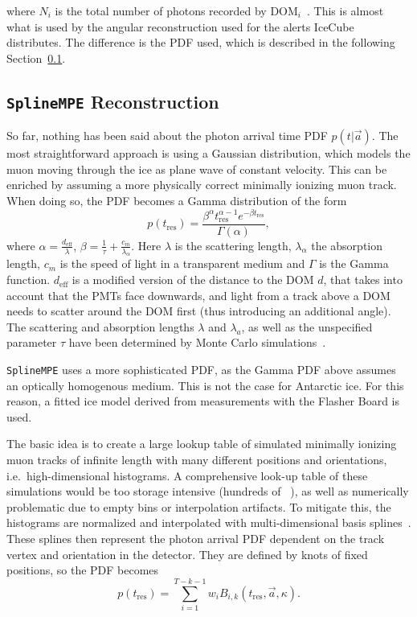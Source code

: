 where $N_i$ is the total number of photons recorded by $\text{DOM}_i$~\cite{Ahrens2004}. This is almost what is used by the angular reconstruction used for the alerts IceCube distributes. The difference is the PDF used, which is described in the following Section~\ref{spline_mpe}.

\subsection{\texttt{SplineMPE} Reconstruction}\label{spline_mpe}
So far, nothing has been said about the photon arrival time PDF $p(t|\vec{a})$. The most straightforward approach is using a Gaussian distribution, which models the muon moving through the ice as plane wave of constant velocity. This can be enriched by assuming a more physically correct minimally ionizing muon track. When doing so, the PDF becomes a Gamma distribution of the form
\begin{equation}
    p(t_\text{res}) = \frac{\beta^\alpha t_\text{res}^{\alpha-1} e^{-\beta t_\text{res}}}{\Gamma(\alpha)},
\end{equation}
where $\alpha=\frac{d_\text{eff}}{\lambda}$, $\beta=\frac{1}{\tau} + \frac{c_m}{\lambda_\alpha}$. Here $\lambda$ is the scattering length, $\lambda_\alpha$ the absorption length, $c_m$ is the speed of light in a transparent medium and $\Gamma$ is the Gamma function. $d_\text{eff}$ is a modified version of the distance to the DOM $d$, that takes into account that the PMTs face downwards, and light from a track above a DOM needs to scatter around the DOM first (thus introducing an additional angle). The scattering and absorption lengths $\lambda$ and $\lambda_a$, as well as the unspecified parameter $\tau$ have been determined by Monte Carlo simulations~.

\texttt{SplineMPE} uses a more sophisticated PDF, as the Gamma PDF above assumes an optically homogenous medium. This is not the case for Antarctic ice. For this reason, a fitted ice model derived from measurements with the Flasher Board is used.

The basic idea is to create a large lookup table of simulated minimally ionizing muon tracks of infinite length with many different positions and orientations, i.e.\ high-dimensional histograms. A comprehensive look-up table of these simulations would be too storage intensive (hundreds of \unit{\giga\byte}), as well as numerically problematic due to empty bins or interpolation artifacts. To mitigate this, the histograms are normalized and interpolated with multi-dimensional basis splines~. These splines then represent the photon arrival PDF dependent on the track vertex and orientation in the detector. They are defined by knots of fixed positions, so the PDF becomes
\begin{equation}
    p(t_\text{res}) = \sum_{i=1}^{T-k-1} w_i B_{i,k}(t_\text{res},\vec{a}, \kappa).
\end{equation}


